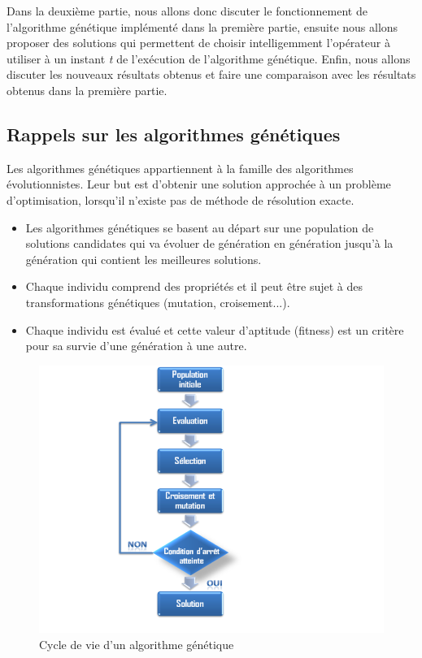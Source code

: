 \documentclass[12pt]{article}
\begin{document}
Dans la deuxième partie, nous allons donc discuter le fonctionnement de l'algorithme génétique implémenté dans la première partie, ensuite nous allons proposer des solutions qui permettent de choisir intelligemment l'opérateur à utiliser à un instant \textit{t} de l'exécution de l'algorithme génétique. Enfin, nous allons discuter les nouveaux résultats obtenus et faire une comparaison avec les résultats obtenus dans la première partie.


\subsection{Rappels sur les algorithmes génétiques}
\par Les algorithmes génétiques appartiennent à la famille des algorithmes évolutionnistes. Leur but est d'obtenir une solution approchée à un problème d'optimisation, lorsqu'il n'existe pas de méthode de résolution exacte.
\begin{itemize}[label=-]
\item Les algorithmes génétiques se basent au départ sur une population de solutions candidates qui va évoluer de génération en génération jusqu’à la génération qui contient les meilleures solutions.
\item Chaque individu comprend des propriétés et il peut être sujet à des transformations génétiques (mutation, croisement...).
\item Chaque individu est évalué et cette valeur d’aptitude (fitness) est un critère pour sa survie d’une génération à une autre.
\end{itemize}

\begin{figure}[H]
		\begin{center}
			\includegraphics[scale=0.4]{img/algo_genetique.png}
			\caption{Cycle de vie d'un algorithme génétique}
			\label{algo_genetique}
		\end{center}
\end{figure}
\end{document}
